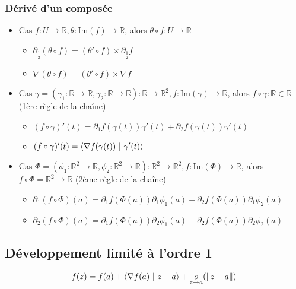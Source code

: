 \documentclass[openany]{book}
\begin{document}
\subsubsection{Dérivé d'un composée}

\begin{itemize}
    \item Cas $f : U \rightarrow \mathbb{R}, \theta : \text{Im}(f)\rightarrow \mathbb{R}$, alors $\theta \circ f : U \rightarrow \mathbb{R}$
    \begin{itemize}
        \item $\partial_{\underset{2}{1}}(\theta \circ f) = (\theta'\circ f) \times \partial_{\underset{2}{1}}f$
        \item $\nabla (\theta \circ f) = (\theta' \circ f) \times \nabla f$
    \end{itemize}
    \item Cas $ \gamma = (\gamma_1 : \mathbb{R} \rightarrow \mathbb{R}, \gamma_2 : \mathbb{R} \rightarrow \mathbb{R}) : \mathbb{R} \rightarrow \mathbb{R}^2, f : \text{Im}(\gamma) \rightarrow \mathbb{R}$, alors $ f \circ \gamma : \mathbb{R} \in \mathbb{R} $ (1ère règle de la chaîne)
    \begin{itemize}
        \item $ (f \circ \gamma)'(t) = \partial_1 f (\gamma(t)) \gamma ' (t) + \partial_2 f (\gamma(t)) \gamma ' (t) $
        \item $ (f \circ \gamma)'(t) = \langle \nabla f (\gamma (t) ) \text{ } | \text{ } \gamma ' (t) \rangle $
    \end{itemize}
    \item Cas $\Phi = (\phi_1 : \mathbb{R}^2 \rightarrow \mathbb{R}, \phi_2 : \mathbb{R}^2 \rightarrow \mathbb{R}) : \mathbb{R}^2 \rightarrow \mathbb{R}^2, f : \text{Im}(\Phi) \rightarrow \mathbb{R}$, alors $ f \circ \Phi = \mathbb{R}^2 \rightarrow \mathbb{R} $ (2ème règle de la chaîne)
    \begin{itemize}
        \item $ \partial_1 (f \circ \Phi)(a) = \partial_1 f(\Phi(a)) \partial_1 \phi_1(a) + \partial_2 f(\Phi(a)) \partial_1 \phi_2(a) $
        \item $ \partial_2 (f \circ \Phi)(a) = \partial_1 f(\Phi(a)) \partial_2 \phi_1(a) + \partial_2 f(\Phi(a)) \partial_2 \phi_2(a) $
    \end{itemize}
\end{itemize}

\subsection{Développement limité à l'ordre 1}
\[ f(z) = f(a) + \langle \nabla f(a) \text{ } | \text{ } z-a \rangle + \underset{z \rightarrow a}{o}(\|z-a\|) \]
\end{document}
